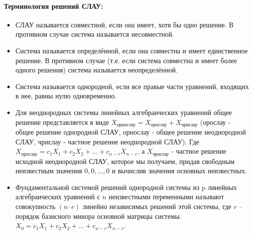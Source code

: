 \documentclass[a4paper,14pt]{article}
\begin{document}
\paragraph{Терминология решений СЛАУ:}
\begin{itemize}
	\item СЛАУ называется совместной, если она имеет, хотя бы одно решение. В противном случае система называется несовместной.
	\item Система называется определённой, если она совместна и имеет единственное решение. В противном случае (т.е. если система совместна и имеет более одного решения) система называется неопределённой.
	\item Система называется однородной, если все правые части уравнений, входящих в нее, равны нулю одновременно.
	\item Для неоднородных системы линейных алгебраических уравнений общее решение представляется в виде $X_{\text{орнослау}} = X_{\text{орослау}} + X_{\text{чрнслау}}$ (орослау - общее решение однородной СЛАУ, орнослау - общее решение неоднородной СЛАУ, чрнслау - частное решение неоднородной СЛАУ). Где $X_{\text{орослау}} = c_1X_1 + c_2X_2 + ... + c_{n-r}X_{n-r}$, а $X_{\text{чрнслау}}$ - частное решение исходной неоднородной СЛАУ, которое мы получаем, придав свободным неизвестным значения $0,0,…,0$ и вычислив значения основных неизвестных.
	\item Фундаментальной системой решений однородной системы из p линейных алгебраических уравнений с $n$ неизвестными переменными называют совокупность $(n – r)$ линейно независимых решений этой системы, где $r$ – порядок базисного минора основной матрицы системы. $X_0 = c_1X_1 + c_2X_2 + ... + c_{n-r}X_{n-r}$.
\end{itemize}
\end{document}
